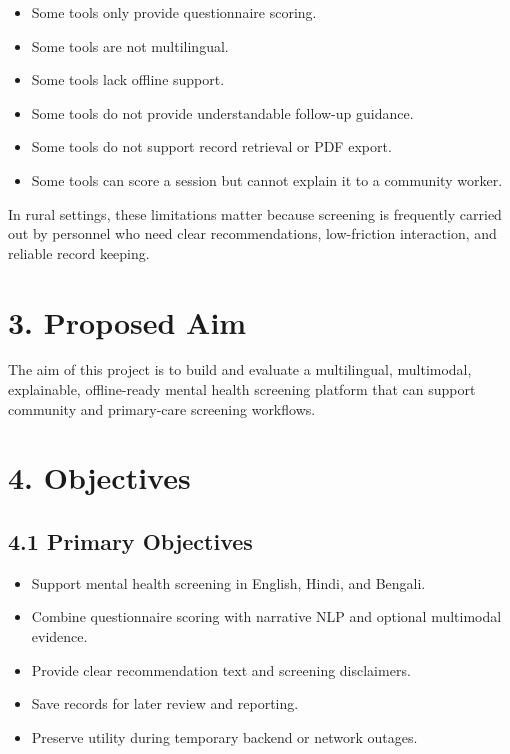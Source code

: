 \documentclass[11pt]{article}
\begin{document}
\begin{itemize}[leftmargin=*]
  \item Some tools only provide questionnaire scoring.
  \item Some tools are not multilingual.
  \item Some tools lack offline support.
  \item Some tools do not provide understandable follow-up guidance.
  \item Some tools do not support record retrieval or PDF export.
  \item Some tools can score a session but cannot explain it to a community worker.
\end{itemize}

In rural settings, these limitations matter because screening is frequently carried out by personnel who need clear recommendations, low-friction interaction, and reliable record keeping.

\section{3. Proposed Aim}
The aim of this project is to build and evaluate a multilingual, multimodal, explainable, offline-ready mental health screening platform that can support community and primary-care screening workflows.

\section{4. Objectives}
\subsection{4.1 Primary Objectives}
\begin{itemize}[leftmargin=*]
  \item Support mental health screening in English, Hindi, and Bengali.
  \item Combine questionnaire scoring with narrative NLP and optional multimodal evidence.
  \item Provide clear recommendation text and screening disclaimers.
  \item Save records for later review and reporting.
  \item Preserve utility during temporary backend or network outages.
\end{itemize}
\end{document}
